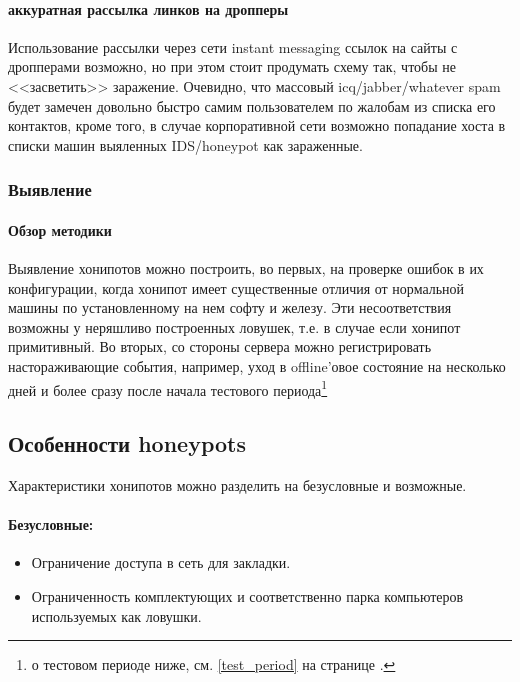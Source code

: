 \paragraph{аккуратная рассылка линков на дропперы\\}
Использование рассылки через сети instant messaging ссылок на сайты с дропперами возможно, но при этом
стоит продумать схему так, чтобы не <<засветить>> заражение. Очевидно, что массовый icq/jabber/whatever
spam  будет замечен довольно быстро самим пользователем по жалобам из списка его контактов, кроме того, в случае корпоративной сети возможно попадание хоста в списки машин выяленных IDS/honeypot как зараженные.

\subsubsection{Выявление}

\paragraph{Обзор методики\\}

Выявление хонипотов можно построить, во первых, на проверке ошибок в их
конфигурации, когда хонипот имеет существенные отличия от нормальной
машины по  установленному на нем софту и железу. Эти несоответствия
возможны у неряшливо построенных ловушек, т.е.  в случае если хонипот
примитивный. Во вторых, со стороны сервера можно регистрировать
настораживающие события, например, уход в offline'овое состояние на
несколько дней и более сразу после начала тестового периода\footnote{о
тестовом периоде ниже, см. \ref{test_period} на странице
\pageref{test_period}.}

\subsection{Особенности honeypots}

Характеристики хонипотов можно разделить на безусловные и возможные.

\paragraph{Безусловные:\\}


\begin{itemize}
\item{Ограничение доступа в сеть для закладки.}
\item{Ограниченность комплектующих и соответственно парка компьютеров
используемых как ловушки.}
\end{itemize}


